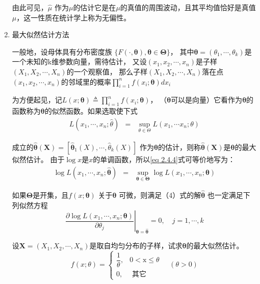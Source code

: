 \begin{enumerate}[1)]
		由此可见，$ \hat{\mu} $ 作为$ \mu $的估计它是在$ \mu $的真值的周围波动，且其平均值恰好是真值$ \mu $，这一性质在统计学上称为无偏性。
		
	\item 最大似然估计方法
	\setlength{\parindent}{2\ccwd}
	
    一般地，设母体具有分布密度族 $ \{F(\cdot ,  \boldsymbol{\theta}),  \boldsymbol{\theta} \in  \boldsymbol{\Theta} \} $，
    其中$  \boldsymbol{\theta} = \left(\theta_{1}, \cdots, \theta_{k}\right) $是一个未知的k维参数向量，需待估计，
    又设$  (x_1, x_2 , \cdots ,x_n) $是子样$  (X_1, X_2 , \cdots ,X_n) $的一个观察值，
     那么子样$  (X_1, X_2 , \cdots ,X_n) $落在点$  (x_1, x_2 , \cdots ,x_n) $的邻域里的概率$ \prod_{i=1}^{n} f\left(x_{i} ;  \boldsymbol{\theta} \right) d x_{i} $
	
    为方便起见，记$ L(x ;  \boldsymbol{\theta} ) \triangleq \prod_{i=1}^{n} f\left(x_{i} ;  \boldsymbol{\theta} \right) $，
    （$  \boldsymbol{\theta} $可以是向量）它看作为$  \boldsymbol{\theta} $的函数称为$  \boldsymbol{\theta} $的似然函数。如果选取使下式
		\begin{eqnarray}
			L\left(x_{1}, \cdots, x_{n} ; \hat{\theta}\right) & = & \sup _{\theta \in \Theta} L\left(x_{1}, \cdots x_{n} ; \theta\right) 
			\label{eq 2.4.4}
		\end{eqnarray}
	
    成立的$  \boldsymbol{\hat{\theta}(X)} =\left[\hat{ \boldsymbol{\theta} }_{1}(X), \cdots, \hat{\theta}_{k}(X)\right]$
    作为$  \boldsymbol{\theta} $的估计，则称$ \boldsymbol{ \hat{\theta}(X)} $是$ \boldsymbol{\theta }$的最大似然估计。
    由于$ \log x  $是$ x $的单调函数，所以\eqref{eq 2.4.4}式可等价地写为：
		\begin{eqnarray}
            \log L\left(x_{1}, \cdots, x_{n} ; \boldsymbol{ \hat{\theta} } \right) & = 
            & \sup _{\boldsymbol{\theta} \in \boldsymbol{\Theta}} \log L\left(x_{1}, \cdots, x_{n} ; \boldsymbol{\theta} \right)
		\end{eqnarray}

	如果$ \boldsymbol{\Theta} $是开集，且$ f(x;\boldsymbol{\theta}) $
	关于$ \boldsymbol{\theta} $ 可微，则满足（4）式的解$ \boldsymbol{\hat{\theta}} $ 也一定满足下列似然方程 
    $$ \left.\dfrac{\partial \log L\left(x_{1}, \cdots, x_{n} ; \boldsymbol{\theta}\right)}
                {\partial \theta_{j}}\right|_{\boldsymbol{ \theta=\hat{\theta}}}=0, \quad j=1, \cdots, k $$

	设$  \boldsymbol{X} = (X_1, X_2 , \cdots ,X_n) $是取自均匀分布的子样，试求$ \boldsymbol{\theta} $的最大似然估计。
	$$  f(x ; \theta)=\left\{\begin{array}{ll}
	\dfrac{1}{\theta}, & 0 < \mathrm{x} \leqslant \theta \\
	0, & \text { 其它 }
	\end{array} \quad(\theta>0)\right. $$
	

\end{enumerate}
